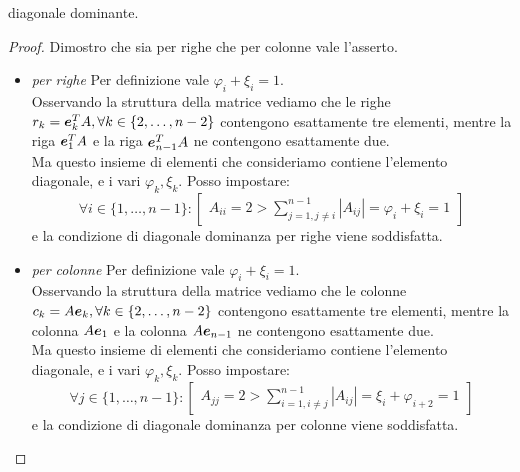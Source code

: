 diagonale dominante. \begin{proof} Dimostro che sia per righe che per colonne
vale l'asserto.
	\begin{itemize}
	  \item \emph{per righe} Per definizione vale $\varphi_{i} + \xi_{i} = 1$.\\ 
	  Osservando la struttura della matrice vediamo che le righe $r_{k} =
	  \boldsymbol{e}_{k}^{T}A, \forall k \in \{2, \ldots, n-2\}$ contengono esattamente
	  tre elementi, mentre la riga $\boldsymbol{e}_{1}^{T}A$ e la riga
	  $\boldsymbol{e}_{n-1}^{T}A$ ne contengono esattamente due. \\
	  Ma questo insieme di elementi che
	  consideriamo contiene l'elemento diagonale, e i vari $\varphi_{k},
	  \xi_{k}$. Posso impostare:
	  \begin{displaymath}
	  	\forall i \in \{ 1, \ldots, n-1\}:
	  	\begin{bmatrix} 
	  		A_{ii} = 2 > \sum_{j = 1, j \not = i}^{n-1}{|A_{ij}|} = \varphi_{i} + 
	  		\xi_{i} = 1
	  	\end{bmatrix}
	  \end{displaymath}
	  e la condizione di diagonale dominanza per righe viene soddisfatta.
	  \item \emph{per colonne} Per definizione vale $\varphi_{i} + \xi_{i} = 1$.\\ 
	  Osservando la struttura della matrice vediamo che le colonne $c_{k} =
	  A\boldsymbol{e}_{k}, \forall k \in \{2, \ldots, n-2\}$ contengono esattamente
	  tre elementi, mentre la colonna $A\boldsymbol{e}_{1}$ e la colonna
	  $A\boldsymbol{e}_{n-1}$ ne contengono esattamente due. \\
	  Ma questo insieme di elementi che
	  consideriamo contiene l'elemento diagonale, e i vari $\varphi_{k},
	  \xi_{k}$. Posso impostare:
	  \begin{displaymath}
	  	\forall j \in \{ 1, \ldots, n-1\}:
	  	\begin{bmatrix} 
	  		A_{jj} = 2 > \sum_{i = 1, i \not = j}^{n-1}{|A_{ij}|} = 
	  		\xi_{i} + \varphi_{i+2}= 1
	  	\end{bmatrix}
	  \end{displaymath}
	  e la condizione di diagonale dominanza per colonne viene soddisfatta.
	\end{itemize}
\end{proof}




